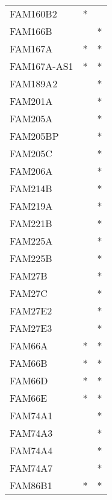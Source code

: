 \begin{longtable}{lcc}
FAM160B2              &              * &            \\
FAM166B               &                &          * \\
FAM167A               &              * &          * \\
FAM167A-AS1           &              * &          * \\
FAM189A2              &                &          * \\
FAM201A               &                &          * \\
FAM205A               &                &          * \\
FAM205BP              &                &          * \\
FAM205C               &                &          * \\
FAM206A               &                &          * \\
FAM214B               &                &          * \\
FAM219A               &                &          * \\
FAM221B               &                &          * \\
FAM225A               &                &          * \\
FAM225B               &                &          * \\
FAM27B                &                &          * \\
FAM27C                &                &          * \\
FAM27E2               &                &          * \\
FAM27E3               &                &          * \\
FAM66A                &              * &          * \\
FAM66B                &              * &          * \\
FAM66D                &              * &          * \\
FAM66E                &              * &          * \\
FAM74A1               &                &          * \\
FAM74A3               &                &          * \\
FAM74A4               &                &          * \\
FAM74A7               &                &          * \\
FAM86B1               &              * &          * \\

\end{longtable}
